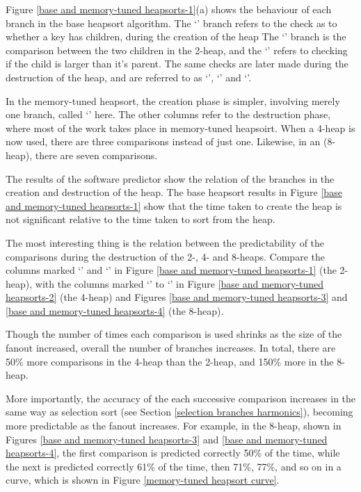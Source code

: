 Figure \ref{base and memory-tuned heapsorts-1}(a) shows the behaviour of each
branch in the base heapsort algorithm. The `' branch
refers to the check as to whether a key has children, during the creation of the
heap The `' branch is the comparison between the
two children in the 2-heap, and the `' refers to
checking if the child is larger than it's parent. The same checks are later made
during the destruction of the heap, and are referred to as `', `' and `'.

In the memory-tuned heapsort, the creation phase is simpler, involving merely
one branch, called `' here. The other columns refer to the
destruction phase, where most of the work takes place in memory-tuned heapsoirt.
When a 4-heap is now used, there are three comparisons instead of just one.
Likewise, in an (8-heap), there are seven comparisons.


The results of the software predictor show the relation of the branches
in the creation and destruction of the heap. The base heapsort results in
Figure \ref{base and memory-tuned heapsorts-1} show that the time taken to
create the heap is not significant relative to the time taken to sort from the
heap.

The most interesting thing is the relation between the predictability of the
comparisons during the destruction of the 2-, 4- and 8-heaps. Compare the
columns marked `' and `' in Figure \ref{base and memory-tuned heapsorts-1} (the 2-heap), with
the columns marked `' to `' in Figure
\ref{base and memory-tuned heapsorts-2} (the 4-heap) and Figures \ref{base and
memory-tuned heapsorts-3} and \ref{base and memory-tuned heapsorts-4} (the
8-heap).

Though the number of times each comparison is used shrinks as the size of the
fanout increased, overall the number of branches increases.  In total, there are
50\% more comparisons in the 4-heap than the 2-heap, and 150\% more in the
8-heap.

More importantly, the accuracy of the each successive comparison increases in
the same way as selection sort (see Section \ref{selection branches harmonics}),
becoming more predictable as the fanout increases. For example, in the 8-heap,
shown in Figures \ref{base and memory-tuned heapsorts-3} and \ref{base and
memory-tuned heapsorts-4}, the first comparison is predicted correctly 50\% of
the time, while the next is predicted correctly 61\% of the time, then 71\%,
77\%, and so on in a curve, which is shown in Figure \ref{memory-tuned heapsort
curve}.

